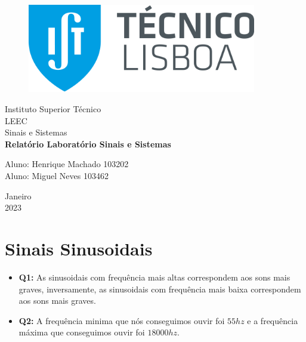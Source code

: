 \documentclass[a4paper, 12pt]{article}
\begin{document}
\begin{titlepage}
    \begin{center}

        \begin{figure}[!ht]
            \centering
            \includegraphics[width=10cm]{images/IST.png}
        \end{figure}

        \Huge{Instituto Superior Técnico}\\
        \large{LEEC}\\
        \large{Sinais e Sistemas}\\
        \vspace{15pt}
        \vspace{95pt}
        \textbf{\LARGE{Relatório Laboratório Sinais e Sistemas}}\\
        \vspace{3,5cm}
    \end{center}

    \begin{flushleft}
        \begin{tabbing}
            Aluno: Henrique Machado 103202 \\
            Aluno: Miguel Neves 103462 \\
        \end{tabbing}
    \end{flushleft}
    \vspace{1cm}

    \begin{center}
        \vspace{\fill}
        Janeiro\\
        2023
    \end{center}
\end{titlepage}
\newpage
\tableofcontents
\thispagestyle{empty}
\newpage
{}
\section{Sinais Sinusoidais}
\begin{itemize}
    \item \textbf{Q1:} As sinusoidais com frequência mais altas correspondem aos sons mais graves, inversamente, as sinusoidais com frequência mais baixa correspondem aos sons mais graves.
    \item \textbf{Q2:} A frequência minima que nós conseguimos ouvir foi $55hz$ e a frequência máxima que conseguimos ouvir foi $18000hz$.
\end{itemize}
\vspace{15px}
\end{document}
